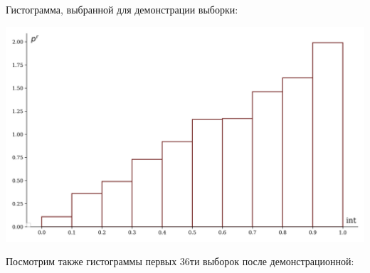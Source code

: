 \documentclass[a4paper, 14pt]{extarticle}
\begin{document}
Гистограмма, выбранной для демонстрации выборки:
\begin{center}
  \includegraphics[width=\textwidth, height=\textheight, keepaspectratio]{test_sample_hist} \\
\end{center}

Посмотрим также гистограммы первых 36ти выборок после демонстрационной:

\newpage{}
\end{document}
